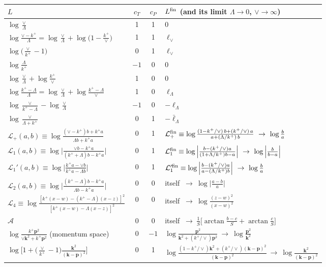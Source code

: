 \documentclass[aps,prd,onecolumn,superscriptaddress,nofootinbib,floatfix,longbibliography,11pt]{revtex4-2}
\numberwithin{equation}{section}
\newcommand{\lV}{\ell_{\vee}}
\newcommand{\lL}{\ell_{\Lambda}}
\newcommand{\lLb}{\bar\ell_{\Lambda}}
\newcommand{\Lp}{\mathcal{L}_{+}}
\newcommand{\Lo}{\mathcal{L}_{1}}
\newcommand{\Lop}{\mathcal{L}_{1}'}
\newcommand{\Lt}{\mathcal{L}_{2}}
\newcommand{\Lf}{\mathcal{L}_{4}}
\begin{document}
\begin{table}[!htbp]
\centering
\small
\renewcommand{\arraystretch}{1.6}
\begin{tabular}{p{6.0cm}ccp{6.4cm}}
\toprule
$L$ & $c_T$ & $c_P$ & $L^{\rm fin}$ (and its limit $\Lambda\to0$, $\vee\to\infty$)\\
\midrule
$\log\frac{\vee}{\Lambda}$ & 1 & 1 & 0\\
$\log\frac{\vee-k^+}{\Lambda}=\log\frac{\vee}{\Lambda}+\log\big(1-\frac{k^+}{\vee}\big)$ & 1 & 1 & $\lV$\\
$\log\big(\frac{\vee}{k^+}-1\big)$ & 0 & 1 & $\lV$\\
$\log\frac{\Lambda}{k^+}$ & $-1$ & 0 & 0\\
$\log\frac{\vee}{\Lambda}+\log\frac{k^+}{\vee}$ & 1 & 0 & 0\\
$\log\frac{k^+-\Lambda}{\Lambda}=\log\frac{\vee}{\Lambda}+\log\frac{k^+-\Lambda}{\vee}$ & 1 & 0 & $\lL$\\
$\log\frac{\vee}{k^+-\Lambda}-\log\frac{\vee}{\Lambda}$ & $-1$ & 0 & $-\lL$\\
$\log\frac{\vee}{\Lambda+k^+}$ & 0 & 1 & $-\lLb$\\
$\Lp(a,b)\equiv\log\frac{(\vee-k^+)b+k^+a}{\Lambda b+k^+a}$ & 0 & 1 & $\Lp^{\rm fin}\equiv\log\frac{(1-k^+/\vee)\,b+(k^+/\vee)\,a}{a+(\Lambda/k^+)\,b}\ \to\ \log\frac ba$\\
$\Lo(a,b)\equiv\log\Big|\frac{\vee b-k^+a}{(k^++\Lambda)b-k^+a}\Big|$ & 0 & 1 & $\Lo^{\rm fin}\equiv\log\Big|\frac{b-(k^+/\vee)a}{(1+\Lambda/k^+)b-a}\Big|\ \to\ \log\Big|\frac{b}{b-a}\Big|$\\
$\Lop(a,b)\equiv\log\Big|\frac{k^+a-\vee b}{k^+a-\Lambda b}\Big|$ & 0 & 1 & $\Lop^{\rm fin}\equiv\log\Big|\frac{b-(k^+/\vee)a}{a-(\Lambda/k^+)b}\Big|\ \to\ \log\frac ba$\\
$\Lt(a,b)\equiv\log\Big|\frac{(k^+-\Lambda)b-k^+a}{\Lambda b-k^+a}\Big|$ & 0 & 0 & itself $\ \to\ \log\Big|\frac{a-b}{a}\Big|$\\
$\Lf\equiv\log\frac{[k^+(x-w)-(k^+-\Lambda)(x-z)]^2}{[k^+(x-w)-\Lambda(x-z)]^2}$ & 0 & 0 & itself $\ \to\ \log\frac{(z-w)^2}{(x-w)^2}$\\
$\mathcal A$ & 0 & 0 & itself $\ \to\ \frac1S\big[\arctan\frac{b-c}{S}+\arctan\frac cS\big]$\\
$\log\frac{k^+\mathbf p^2}{\vee\mathbf k^2+k^+\mathbf p^2}$ (momentum space) & 0 & $-1$ & $\log\frac{\mathbf p^2}{\mathbf k^2+(k^+/\vee)\mathbf p^2}\ \to\ \log\frac{\mathbf p^2}{\mathbf k^2}$\\
$\log\big[1+\big(\frac{\vee}{k^+}-1\big)\frac{\mathbf k^2}{(\mathbf k-\mathbf p)^2}\big]$ & 0 & 1 & $\log\frac{(1-k^+/\vee)\mathbf k^2+(k^+/\vee)(\mathbf k-\mathbf p)^2}{(\mathbf k-\mathbf p)^2}\ \to\ \log\frac{\mathbf k^2}{(\mathbf k-\mathbf p)^2}$\\

\end{tabular}
\end{table}
\end{document}
